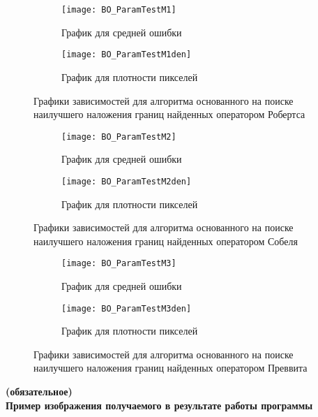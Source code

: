 \begin{figure}[h]
	\centering
	\begin{subfigure}{0.45\textwidth}  
		\centering
		\texttt{[image: BO\_ParamTestM1]}
		\caption*{График для средней ошибки}
	\end{subfigure}    
	\begin{subfigure}{0.45\textwidth}  
		\centering
		\texttt{[image: BO\_ParamTestM1den]}        
		\caption*{График для плотности пикселей}
	\end{subfigure}
	\caption{Графики зависимостей для алгоритма основанного на поиске наилучшего наложения границ найденных оператором Робертса}
	\label{fig:PT_BO_M1}
\end{figure}
\begin{figure}[h]
\centering
\begin{subfigure}{0.45\textwidth}  
	\centering
	\texttt{[image: BO\_ParamTestM2]}
	\caption*{График для средней ошибки}
\end{subfigure}    
\begin{subfigure}{0.45\textwidth}  
	\centering
	\texttt{[image: BO\_ParamTestM2den]}        
	\caption*{График для плотности пикселей}
\end{subfigure}
\caption{Графики зависимостей для алгоритма основанного на поиске наилучшего наложения границ найденных оператором Собеля}
\label{fig:PT_BO_M2}
\end{figure}
\begin{figure}[h]
\centering
\begin{subfigure}{0.45\textwidth}  
	\centering
	\texttt{[image: BO\_ParamTestM3]}
	\caption*{График для средней ошибки}
\end{subfigure}    
\begin{subfigure}{0.45\textwidth}  
	\centering
	\texttt{[image: BO\_ParamTestM3den]}        
	\caption*{График для плотности пикселей}
\end{subfigure}
\caption{Графики зависимостей для алгоритма основанного на поиске наилучшего наложения границ найденных оператором Преввита}
\label{fig:PT_BO_M3}
\end{figure}


\setcounter{section}{3}
\setcounter{figure}{0}
\begin{center}
	\vspace{-1em}
	\textbf{ (обязательное)}\\	
	\textbf{Пример изображения получаемого в результате работы программы}
\end{center}

